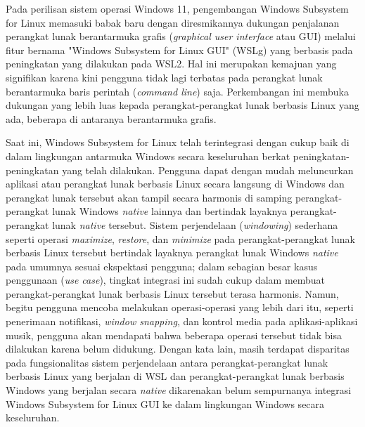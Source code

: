 Pada perilisan sistem operasi Windows 11, pengembangan Windows Subsystem for Linux memasuki babak baru dengan diresmikannya dukungan penjalanan perangkat lunak berantarmuka grafis (\textit{graphical user interface} atau GUI) melalui fitur bernama "Windows Subsystem for Linux GUI" (WSLg) yang berbasis pada peningkatan yang dilakukan pada WSL2. Hal ini merupakan kemajuan yang signifikan karena kini pengguna tidak lagi terbatas pada perangkat lunak berantarmuka baris perintah (\textit{command line}) saja. Perkembangan ini membuka dukungan yang lebih luas kepada perangkat-perangkat lunak berbasis Linux yang ada, beberapa di antaranya berantarmuka grafis.

Saat ini, Windows Subsystem for Linux telah terintegrasi dengan cukup baik di dalam lingkungan antarmuka Windows secara keseluruhan berkat peningkatan-peningkatan yang telah dilakukan. Pengguna dapat dengan mudah meluncurkan aplikasi atau perangkat lunak berbasis Linux secara langsung di Windows dan perangkat lunak tersebut akan tampil secara harmonis di samping perangkat-perangkat lunak Windows \textit{native} lainnya dan bertindak layaknya perangkat-perangkat lunak \textit{native} tersebut. Sistem perjendelaan (\textit{windowing}) sederhana seperti operasi \textit{maximize}, \textit{restore}, dan \textit{minimize} pada perangkat-perangkat lunak berbasis Linux tersebut bertindak layaknya perangkat lunak Windows \textit{native} pada umumnya sesuai ekspektasi pengguna; dalam sebagian besar kasus penggunaan (\textit{use case}), tingkat integrasi ini sudah cukup dalam membuat perangkat-perangkat lunak berbasis Linux tersebut terasa harmonis. Namun, begitu pengguna mencoba melakukan operasi-operasi yang lebih dari itu, seperti penerimaan notifikasi, \textit{window snapping}, dan kontrol media pada aplikasi-aplikasi musik, pengguna akan mendapati bahwa beberapa operasi tersebut tidak bisa dilakukan karena belum didukung. Dengan kata lain, masih terdapat disparitas pada fungsionalitas sistem perjendelaan antara perangkat-perangkat lunak berbasis Linux yang berjalan di WSL dan perangkat-perangkat lunak berbasis Windows yang berjalan secara \textit{native} dikarenakan belum sempurnanya integrasi Windows Subsystem for Linux GUI ke dalam lingkungan Windows secara keseluruhan.

